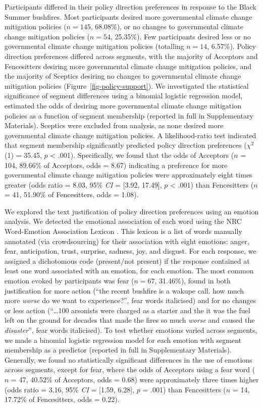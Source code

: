 \documentclass[
  letterpaper,
  DIV=11,
  numbers=noendperiod]{scrartcl}
\begin{document}
Participants differed in their policy direction preferences in response
to the Black Summer bushfires. Most participants desired more
governmental climate change mitigation policies (\(n = 145\), 68.08\%),
or no changes to governmental climate change mitigation policies
(\(n = 54\), 25.35\%). Few participants desired less or no governmental
climate change mitigation policies (totalling \(n = 14\), 6.57\%).
Policy direction preferences differed across segments, with the majority
of Acceptors and Fencesitters desiring more governmental climate change
mitigation policies, and the majority of Sceptics desiring no changes to
governmental climate change mitigation policies
(Figure~\ref{fig-policy-support}). We investigated the statistical
significance of segment differences using a binomial logistic regression
model, estimated the odds of desiring more governmental climate change
mitigation policies as a function of segment membership (reported in
full in Supplementary Materials). Sceptics were excluded from analysis,
as none desired more governmental climate change mitigation policies. A
likelihood-ratio test indicated that segment membership significantly
predicted policy direction preferences (\(\chi^{2}\) (1) = 35.45, \(p\)
\textless{} .001). Specifically, we found that the odds of Acceptors
(\(n\) = 104, 89.66\% of Acceptors, odds = 8.67) indicating a preference
for more governmental climate change mitigation policies were
approximately eight times greater (odds ratio = 8.03, 95\% \emph{CI} =
{[}3.92, 17.49{]}, \(p\) \textless{} .001) than Fencesitters (\(n\) =
41, 51.90\% of Fencesitters, odds = 1.08).

We explored the text justification of policy direction preferences using
an emotion analysis. We detected the emotional association of each word
using the NRC Word-Emotion Association Lexicon \citep{mohammad_2013}.
This lexicon is a list of words manually annotated (via crowdsourcing)
for their association with eight emotions: anger, fear, anticipation,
trust, surprise, sadness, joy, and disgust. For each response, we
assigned a dichotomous code (present/not present) if the response
contained at least one word associated with an emotion, for each
emotion. The most common emotion evoked by participants was fear
(\(n = 67\), 31.46\%), found in both justification for more action
(``the recent bushfire is a wakupe call. how much more \emph{worse} do
we want to experience?'', fear words italicised) and for no changes or
less action (``\ldots100 arsonists were charged as a starter and the it
was the fuel left on the ground for decades that made the fires so much
\emph{worse} and caused the \emph{disaster}'', fear words italicised).
To test whether emotions varied across segments, we made a binomial
logistic regression model for each emotion with segment membership as a
predictor (reported in full in Supplementary Materials). Generally, we
found no statistically significant differences in the use of emotions
across segments, except for fear, where the odds of Acceptors using a
fear word (\(n\) = 47, 40.52\% of Acceptors, odds = 0.68) were
approximately three times higher (odds ratio = 3.16, 95\% \emph{CI} =
{[}1.59, 6.28{]}, \(p\) = .001) than Fencesitters (\(n\) = 14, 17.72\%
of Fencesitters, odds = 0.22).
\end{document}
